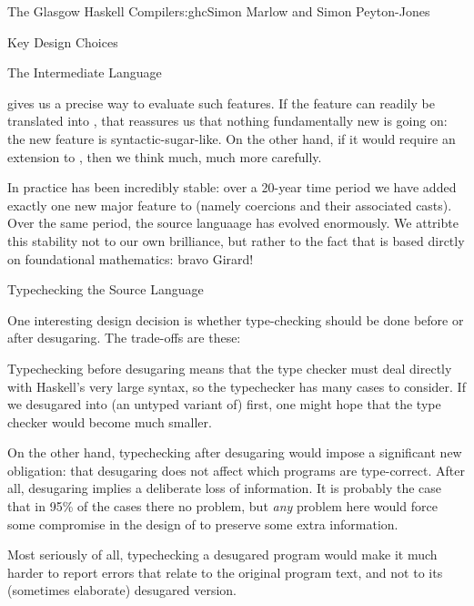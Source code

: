 \begin{aosachapter}{The Glasgow Haskell Compiler}{s:ghc}{Simon Marlow and Simon Peyton-Jones}
\begin{aosasect1}{Key Design Choices}
\begin{aosasect2}{The Intermediate Language}
\begin{aosaitemize}
   gives us a precise way to evaluate such features.  If the
  feature can readily be translated into , that reassures us
  that nothing fundamentally new is going on: the new feature is
  syntactic-sugar-like. On the other hand, if it would require an
  extension to , then we think much, much more carefully.

\end{aosaitemize}

In practice  has been incredibly stable: over a 20-year time
period we have added exactly one new major feature to  (namely
coercions and their associated casts).  Over the same period, the
source languaage has evolved enormously.  We attribte this stability
not to our own brilliance, but rather to the fact that  is
based dirctly on foundational mathematics: bravo Girard!

\end{aosasect2}

\begin{aosasect2}{Typechecking the Source Language}

One interesting design decision is whether type-checking should be
done before or after desugaring.  The trade-offs are these:

\begin{aosaitemize}

\item Typechecking before desugaring means that the type checker must
  deal directly with Haskell's very large syntax, so the typechecker
  has many cases to consider.  If we desugared into (an untyped
  variant of)  first, one might hope that the type checker
  would become much smaller.

\item On the other hand, typechecking after desugaring would impose a
  significant new obligation: that desugaring does not affect which
  programs are type-correct.  After all, desugaring implies a
  deliberate loss of information.  It is probably the case that in
  95\% of the cases there no problem, but \emph{any} problem here
  would force some compromise in the design of  to preserve
  some extra information.

\item Most seriously of all, typechecking a desugared program would
  make it much harder to report errors that relate to the original
  program text, and not to its (sometimes elaborate) desugared
  version.


\end{aosaitemize}
\end{aosasect2}
\end{aosasect1}
\end{aosachapter}
